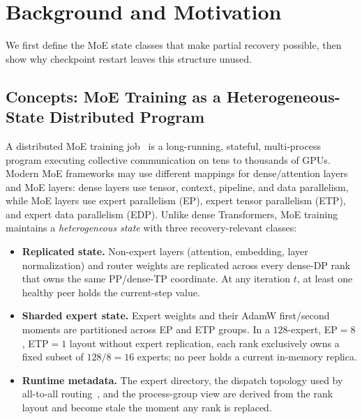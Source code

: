 \documentclass[10pt,conference]{IEEEtran}
\begin{document}
\section{Background and Motivation}
\label{sec:background}

We first define the MoE state classes that make partial recovery possible, then show why checkpoint restart leaves this structure unused.

\subsection{Concepts: MoE Training as a Heterogeneous-State Distributed Program}
\label{sec:bg-concept}

A distributed MoE training job~\cite{lepikhin2021gshard,fedus2022switch,rajbhandari2022deepspeedmoe,hwang2023tutel,gale2023megablocks,yan2026megatroncore} is a long-running, stateful, multi-process program executing collective communication on tens to thousands of GPUs. Modern MoE frameworks may use different mappings for dense/attention layers and MoE layers: dense layers use tensor, context, pipeline, and data parallelism, while MoE layers use expert parallelism (EP), expert tensor parallelism (ETP), and expert data parallelism (EDP). Unlike dense Transformers, MoE training maintains a \emph{heterogeneous state} with three recovery-relevant classes:
\begin{itemize}
    \item \textbf{Replicated state.} Non-expert layers (attention, embedding, layer normalization) and router weights are replicated across every dense-DP rank that owns the same PP/dense-TP coordinate. At any iteration $t$, at least one healthy peer holds the current-step value.
    \item \textbf{Sharded expert state.} Expert weights and their AdamW first/second moments are partitioned across EP and ETP groups. In a $128$-expert, EP$=8$, ETP$=1$ layout without expert replication, each rank exclusively owns a fixed subset of $128/8=16$ experts; no peer holds a current in-memory replica.
    \item \textbf{Runtime metadata.} The expert directory, the dispatch topology used by all-to-all routing~\cite{he2022fastermoe,zhai2023smartmoe}, and the process-group view are derived from the rank layout and become stale the moment any rank is replaced.
\end{itemize}
\end{document}
